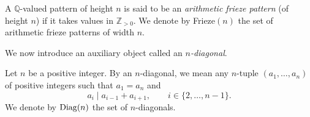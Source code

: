 \begin{definition}
    \label{def:arith_fp}
        A $\mathbb{Q}$-valued pattern of height $n$ is said to be an \textit{arithmetic frieze pattern} (of height $n$) if it takes values in $\mathbb{Z}_{>0}$. 
        We denote by Frieze$(n)$ the set of arithmetic frieze patterns of width $n$. 
\end{definition}

We now introduce an auxiliary object called an {\it $n$-diagonal}. 
\begin{definition}
    \label{def:nDiag}
    Let $n$ be a positive integer. By an $n$-diagonal, we mean any $n$-tuple $(a_1,\ldots, a_n)$ of positive integers 
    such that $a_1 = a_n$ and 
    \[
        a_i \mid a_{i-1} + a_{i+1}, \qquad i \in \{2, \ldots, n-1\}.
    \]
    We denote by ${\rm Diag}(n)$ the set of $n$-diagonals.
\end{definition}



